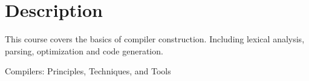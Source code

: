 \documentclass{syllabus}
\begin{document}
\section*{Description}

This course covers the basics of compiler construction.  Including lexical analysis, parsing, optimization and code generation. 


\begin{text}{Compilers: Principles, Techniques, and Tools}
\end{text}

\begin{grading}
\end{grading}




\cheating

\ada

\end{document}
